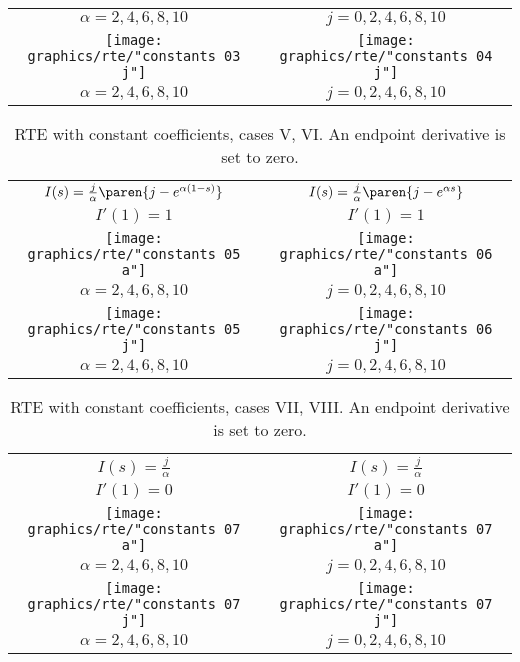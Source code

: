 \begin{landscape}
\begin{table}[htdp]
\begin{center}
\begin{tabular}{cc}
$\alpha = 2, 4, 6, 8, 10$& $j = 0, 2, 4, 6, 8, 10$\\
%
\texttt{[image: graphics/rte/"constants 03 j"]} &
\texttt{[image: graphics/rte/"constants 04 j"]} \\[-12pt]
%
$\alpha = 2, 4, 6, 8, 10$ & $j = 0, 2, 4, 6, 8, 10$\\
%
\end{tabular}
\end{center}
\label{tab:ode:constant:2}
\end{table}
\begin{table}[htdp]
\caption[RTE with constant coefficients, cases V, VI]{RTE with constant coefficients, cases V, VI. An endpoint derivative is set to zero.}
\begin{center}
\begin{tabular}{cc}
%
$I(s) = \frac{j}{\alpha}\paren{j-e^{\alpha(1-s)}}$ & $I(s) = \frac{j}{\alpha}\paren{j-e^{\alpha s}}$ \\[4pt]
%
$I'(1) = 1$ & $I'(1) = 1$ \\
%
\texttt{[image: graphics/rte/"constants 05 a"]} &
\texttt{[image: graphics/rte/"constants 06 a"]} \\[-12pt]
%
$\alpha = 2, 4, 6, 8, 10$& $j = 0, 2, 4, 6, 8, 10$\\
%
\texttt{[image: graphics/rte/"constants 05 j"]} &
\texttt{[image: graphics/rte/"constants 06 j"]} \\[-12pt]
%
$\alpha = 2, 4, 6, 8, 10$ & $j = 0, 2, 4, 6, 8, 10$\\
%
\end{tabular}
\end{center}
\label{tab:ode:constant:3}
\end{table}
\begin{table}[htdp]
\caption[RTE with constant coefficients, cases VII, VIII]{RTE with constant coefficients, cases VII, VIII. An endpoint derivative is set to zero.}
\begin{center}
\begin{tabular}{cc}
%
$I(s) = \frac{j}{\alpha}$ & $I(s) = \frac{j}{\alpha}$ \\[4pt]
%
$I'(1) = 0$ & $I'(1) = 0$ \\
%
\texttt{[image: graphics/rte/"constants 07 a"]} &
\texttt{[image: graphics/rte/"constants 07 a"]} \\[-12pt]
%
$\alpha = 2, 4, 6, 8, 10$& $j = 0, 2, 4, 6, 8, 10$\\
%
\texttt{[image: graphics/rte/"constants 07 j"]} &
\texttt{[image: graphics/rte/"constants 07 j"]} \\[-12pt]
%
$\alpha = 2, 4, 6, 8, 10$ & $j = 0, 2, 4, 6, 8, 10$\\
%
\end{tabular}
\end{center}
\label{tab:ode:constant:4}
\end{table}
%
\end{landscape}
%

